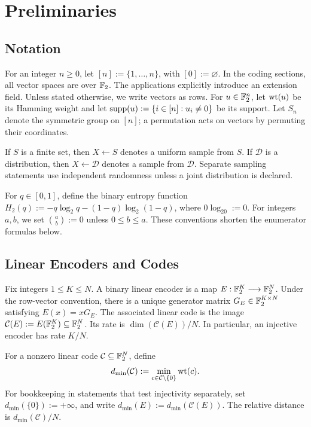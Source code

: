 \section{Preliminaries}
\label{sec:preliminaries}

\subsection{Notation}

For an integer $n\ge0$, let $[n]:=\{1,\ldots,n\}$, with $[0]:=\varnothing$.
In the coding sections, all vector spaces are over $\mathbb F_2$.
The applications explicitly introduce an extension field.
Unless stated otherwise, we write vectors as rows. For
$u\in\mathbb F_2^n$, let $\operatorname{wt}(u)$ be its Hamming weight and let
$\operatorname{supp}(u):=\{i\in[n]:u_i\ne0\}$ be its support. Let $S_n$ denote the symmetric
group on $[n]$; a permutation acts on vectors by permuting their coordinates.

If $S$ is a finite set, then $X\gets S$ denotes a uniform sample from $S$. If
$\mathcal D$ is a distribution, then $X\gets\mathcal D$ denotes a sample from
$\mathcal D$. Separate sampling statements use independent randomness unless
a joint distribution is declared.

For $q\in[0,1]$, define the binary entropy function
$H_2(q):=-q\log_2q-(1-q)\log_2(1-q)$, where $0\log_20:=0$. For integers $a,b$, we set $\binom{a}{b}:=0$ unless
$0\le b\le a$. These conventions shorten the enumerator formulas below.

\subsection{Linear Encoders and Codes}

Fix integers $1\le K\le N$. A binary linear encoder is a map
$E:\mathbb F_2^K\longrightarrow\mathbb F_2^N$. Under the row-vector convention, there is a unique generator matrix
$G_E\in\mathbb F_2^{K\times N}$ satisfying $E(x)=xG_E$. The associated linear code is
the image $\mathcal C(E):=E(\mathbb F_2^K)\subseteq\mathbb F_2^N$.
Its rate is $\dim(\mathcal C(E))/N$. In particular, an injective encoder has
rate $K/N$.

For a nonzero linear code $\mathcal C\subseteq\mathbb F_2^N$, define
\[
  d_{\min}(\mathcal C)
  :=\min_{c\in\mathcal C\setminus\{0\}}\operatorname{wt}(c).
\]
For bookkeeping in statements that test injectivity separately, set
$d_{\min}(\{0\}):=+\infty$, and write
$d_{\min}(E):=d_{\min}(\mathcal C(E))$. The relative distance is
$d_{\min}(\mathcal C)/N$.

